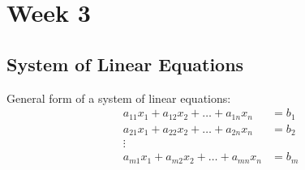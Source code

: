 \newpage
\section{Week 3}
\subsection{System of Linear Equations}
General form of a system of linear equations:
\begin{equation}
    \begin{aligned}
        a_{11}x_1 + a_{12}x_2 + \ldots + a_{1n}x_n &= b_1 \\
        a_{21}x_1 + a_{22}x_2 + \ldots + a_{2n}x_n &= b_2 \\
        \vdots \\
        a_{m1}x_1 + a_{m2}x_2 + \ldots + a_{mn}x_n &= b_m \\
    \end{aligned}
\end{equation}